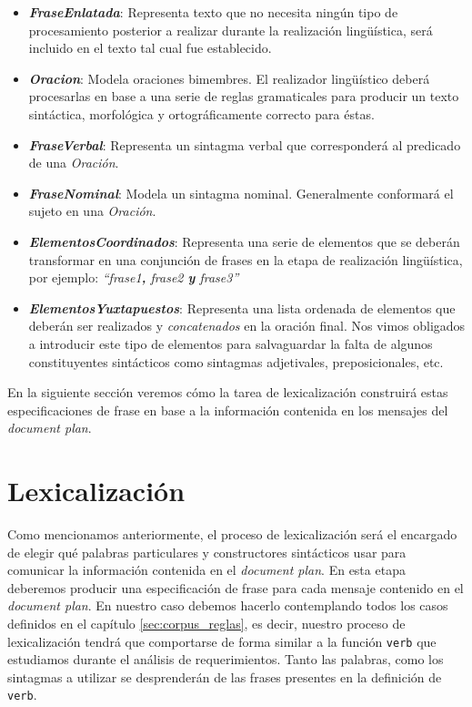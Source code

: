 \medskip
\begin{itemize}
\item{\emph{\textbf{FraseEnlatada}}: Representa texto que no necesita ningún tipo de procesamiento posterior a realizar durante la realización lingüística, será incluido en el texto tal cual fue establecido.}
\item{\emph{\textbf{Oracion}}: Modela oraciones bimembres. El realizador lingüístico deberá procesarlas en base a una serie de reglas gramaticales para producir un texto sintáctica, morfológica y ortográficamente correcto para éstas.}
\item{\emph{\textbf{FraseVerbal}}: Representa un sintagma verbal que corresponderá al predicado de una \emph{Oración}.}
\item{\emph{\textbf{FraseNominal}}: Modela un sintagma nominal. Generalmente conformará el sujeto en una \emph{Oración}.}
\item{\emph{\textbf{ElementosCoordinados}}: Representa una serie de elementos que se deberán transformar en una conjunción de frases en la etapa de realización lingüística, por ejemplo: \emph{``frase1\textbf{,} frase2 \textbf{y} frase3''}}
\item{\emph{\textbf{ElementosYuxtapuestos}}: Representa una lista ordenada de elementos que deberán ser realizados y \emph{concatenados} en la oración final. Nos vimos obligados a introducir este tipo de elementos para salvaguardar la falta de algunos constituyentes sintácticos como sintagmas adjetivales, preposicionales, etc.}
\end{itemize}

\bigskip
En la siguiente sección veremos cómo la tarea de lexicalización construirá estas especificaciones de frase en base a la información contenida en los mensajes del \textit{document plan}.

\section{Lexicalización}
\label{sec:microplanning_lexicalization}

Como mencionamos anteriormente, el proceso de lexicalización será el encargado de elegir qué palabras particulares y constructores sintácticos usar para comunicar la información contenida en el \textit{document plan}. En esta etapa deberemos producir una especificación de frase para cada mensaje contenido en el \textit{document plan}. En nuestro caso debemos hacerlo contemplando todos los casos definidos en el capítulo \ref{sec:corpus_reglas}, es decir, nuestro proceso de lexicalización tendrá que comportarse de forma similar a la función \texttt{verb} que estudiamos durante el análisis de requerimientos. Tanto las palabras, como los sintagmas a utilizar se desprenderán de las frases presentes en la definición de \texttt{verb}.


